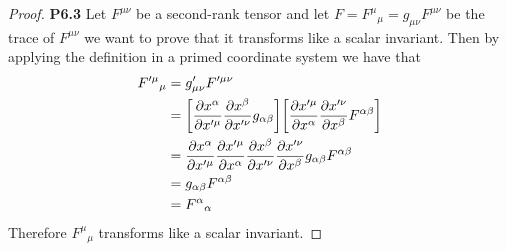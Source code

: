 \documentclass[11pt]{article}
\theoremstyle{definition}
\begin{document}
\begin{proof}{\textbf{P6.3}}
    Let $F^{\mu\nu}$ be a second-rank tensor and let
    $F = {F^\mu}_\mu = g_{\mu\nu} F^{\mu\nu}$ be the trace of $F^{\mu\nu}$
    we want to prove that it transforms like a scalar invariant. Then
    by applying the definition in a primed coordinate system we have that 
    \begin{align*}
        {F'^\mu}_\mu &= g'_{\mu\nu} F'^{\mu\nu}\\
           &= \bigg[\partialderivative{x^\alpha}{x'^\mu}
           \partialderivative{x^\beta}{x'^\nu}
           g_{\alpha\beta}\bigg]
           \bigg[\partialderivative{x'^\mu}{x^\alpha}
           \partialderivative{x'^\nu}{x^\beta} F^{\alpha\beta}\bigg]\\
           &=\partialderivative{x^\alpha}{x'^\mu}
           \partialderivative{x'^\mu}{x^\alpha}
           \partialderivative{x^\beta}{x'^\nu}
           \partialderivative{x'^\nu}{x^\beta}
           g_{\alpha\beta} F^{\alpha\beta}\\
           &= g_{\alpha\beta} F^{\alpha\beta}\\
           &= {F^{\alpha}}_\alpha
    \end{align*}
    Therefore ${F^\mu}_\mu$ transforms like a scalar invariant.
\end{proof}
\end{document}
